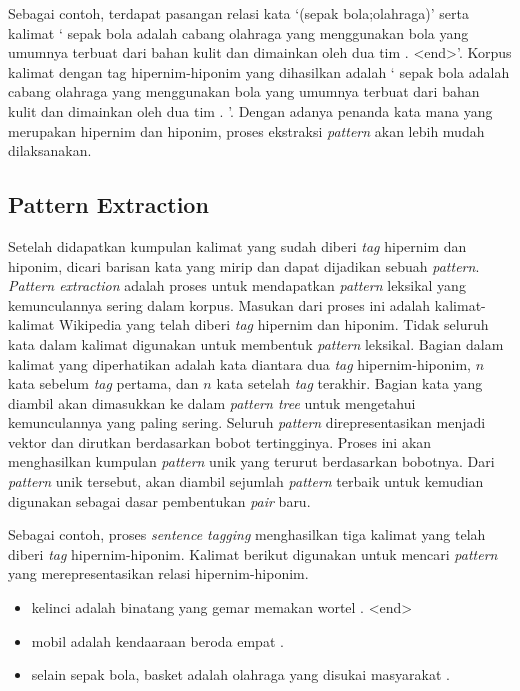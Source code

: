 Sebagai contoh, terdapat pasangan relasi kata `(sepak bola;olahraga)' serta kalimat `{\tagStart} sepak bola adalah cabang olahraga yang menggunakan bola yang umumnya terbuat dari bahan kulit dan dimainkan oleh dua tim . {\selectfont<end>}'. Korpus kalimat dengan tag hipernim-hiponim yang dihasilkan adalah `{\tagStart} {\tagHyponym}sepak bola{\tagHyponym} adalah cabang {\tagHypernym}olahraga{\tagHypernym} yang menggunakan bola yang umumnya terbuat dari bahan kulit dan dimainkan oleh dua tim . {\tagEnd}'. Dengan adanya penanda kata mana yang merupakan hipernim dan hiponim, proses ekstraksi \textit{pattern} akan lebih mudah dilaksanakan.

\subsection{Pattern Extraction}
Setelah didapatkan kumpulan kalimat yang sudah diberi \textit{tag} hipernim dan hiponim, dicari barisan kata yang mirip dan dapat dijadikan sebuah \textit{pattern}. \textit{Pattern extraction} adalah proses untuk mendapatkan \textit{pattern} leksikal yang kemunculannya sering dalam korpus. Masukan dari proses ini adalah kalimat-kalimat Wikipedia yang telah diberi \textit{tag} hipernim dan hiponim. Tidak seluruh kata dalam kalimat digunakan untuk membentuk \textit{pattern} leksikal. Bagian dalam kalimat yang diperhatikan adalah kata diantara dua \textit{tag} hipernim-hiponim, $n$ kata sebelum \textit{tag} pertama, dan $n$ kata setelah \textit{tag} terakhir. Bagian kata yang diambil akan dimasukkan ke dalam \textit{pattern tree} untuk mengetahui kemunculannya yang paling sering. Seluruh \textit{pattern} direpresentasikan menjadi vektor dan dirutkan berdasarkan bobot tertingginya. Proses ini akan menghasilkan kumpulan \textit{pattern} unik yang terurut berdasarkan bobotnya. Dari \textit{pattern} unik tersebut, akan diambil sejumlah \textit{pattern} terbaik untuk kemudian digunakan sebagai dasar pembentukan \textit{pair} baru.

Sebagai contoh, proses \textit{sentence tagging} menghasilkan tiga kalimat yang telah diberi \textit{tag} hipernim-hiponim. Kalimat berikut digunakan untuk mencari \textit{pattern} yang merepresentasikan relasi hipernim-hiponim.
\begin{itemize}
  \item {\tagStart} {\tagHyponym}kelinci{\tagHyponym} adalah {\tagHypernym}binatang{\tagHypernym} yang gemar memakan wortel . {\selectfont<end>}
  \item {\tagStart} {\tagHyponym}mobil{\tagHyponym} adalah {\tagHypernym}kendaaraan{\tagHypernym} beroda empat . {\tagEnd}
  \item {\tagStart} selain sepak bola, {\tagHyponym}basket{\tagHyponym} adalah {\tagHypernym}olahraga{\tagHypernym} yang disukai masyarakat . {\tagEnd}
\end{itemize}

